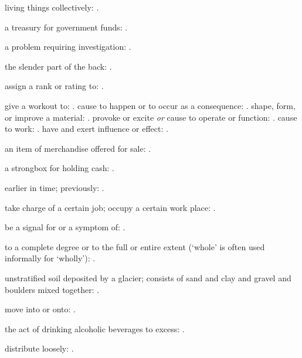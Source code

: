   living things collectively: .

  a treasury for government funds:   .

  a problem requiring investigation: .

  the slender part of the back: .

  assign a rank or rating to:   .

  give a workout to:   . cause to happen or to occur as a consequence:   . shape, form, or improve a material:   . provoke or excite \textit{or} cause to operate or function: . cause to work:   . have and exert influence or effect:   .

  an item of merchandise offered for sale: .

  a strongbox for holding cash:   .

  earlier in time; previously: .

  take charge of a certain job; occupy a certain work place: .

  be a signal for or a symptom of:   .

  to a complete degree or to the full or entire extent (`whole' is often used informally for `wholly'):   .

  unstratified soil deposited by a glacier; consists of sand and clay and gravel and boulders mixed together:   .

  move into or onto: .

  the act of drinking alcoholic beverages to excess:   .

  distribute loosely:   .

